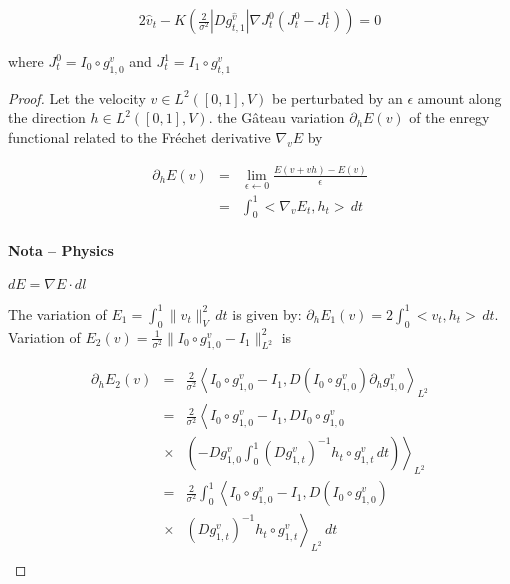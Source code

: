 \documentclass[final, paper=letter,5p,times,twocolumn]{elsarticle}
\theoremstyle{definition}
\begin{document}
{\begin{equation}
\begin{array}{rcl}
2\hat{v}_{t} - K \left( \frac{2}{\sigma^{2}} |D g_{t,1}^{\hat{v}}| \nabla J_{t}^{0}(J_{t}^{0} - J_{t}^{1}) \right) = 0
\end{array}
\end{equation}

where $J_{t}^{0} = I_{0} \circ g_{1,0}^{v}$ and $J_{t}^{1} = I_{1} \circ g_{t,1}^{v}$

\begin{proof}
  Let the velocity $v \in L^{2}([0,1],V)$ be perturbated by an $\epsilon$ amount along the direction $h \in L^{2}([0,1],V)$. the G\^ateau variation $\partial_{h}E(v)$ of the enregy functional related to the Fr\'echet derivative $\nabla_{v}E$ by

  \begin{equation*}
    \begin{array}{rcl}
      \partial_{h}E(v) & = & \underset{\epsilon \leftarrow 0}{\lim} \frac{E(v + vh) - E(v)}{\epsilon} \\
      & = & \int_{0}^{1} <\nabla_{v}E_{t}, h_{t}>\, dt 
      \end{array}
    \end{equation*}

    \paragraph{Nota -- Physics}{$dE = \nabla E \cdot dl$}

    The variation of $E_{1} = \int_{0}^{1} \| v_{t} \|_{V}^{2} \, dt$ is given by: $\partial_{h} E_{1}(v) = 2 \int_{0}^{1} <v_{t},h_{t}> \, dt$. Variation of $E_{2}(v) = \frac{1}{\sigma^{2}} \| I_{0} \circ g_{1,0}^{v} - I_{1}\|_{L^{2}}^{2}$ is

  \begin{equation*}
    \begin{array}{lcl}
      \partial_{h} E_{2}(v) & = & \frac{2}{\sigma^{2}} \left< I_{0} \circ g_{1,0}^{v} - I_{1}, D\left( I_{0} \circ g_{1,0}^{v} \right) \partial_{h} g_{1,0}^{v}  \right>_{L^{2}} \\
      & = & \frac{2}{\sigma^{2}} \left< I_{0} \circ g_{1,0}^{v} - I_{1}, D I_{0} \circ g_{1,0}^{v} \right . \\
      & \times & \left. \left( -D g_{1,0}^{v} \int_{0}^{1} \left( D g_{1,t}^{v} \right)^{-1} h_{t} \circ g_{1,t}^{v} \, dt \right) \right>_{L^{2}}\\
      & = & \frac{2}{\sigma^{2}} \int_{0}^{1} \left< I_{0} \circ g_{1,0}^{v} - I_{1}, D\left( I_{0} \circ g_{1,0}^{v} \right) \right . \\
      & \times & \left. \left( D g_{1,t}^{v} \right)^{-1} h_{t} \circ g_{1,t}^{v}\right>_{L^{2}} \, dt \\
      \end{array}
  \end{equation*}


\end{proof}}
\end{document}
